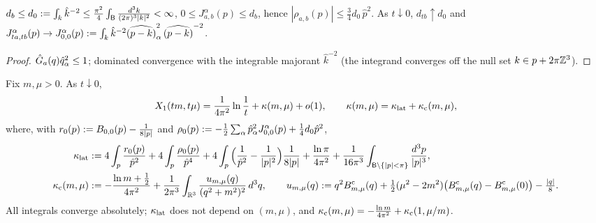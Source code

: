 \begin{lemma}[$d$ and $J$]\label{lem:a05:J}
$d_b\le d_0:=\int_{k}\hat k^{-2}\le\frac{\pi^2}4\int_{\mathsf B}\frac{d^3k}{(2\pi)^3|k|^2}<\infty$, $0\le J^\alpha_{a,b}(p)\le d_b$, hence $|\rho_{a,b}(p)|\le\frac34d_0\,\hat p^2$. As $t\downarrow0$, $d_{tb}\uparrow d_0$ and $J^\alpha_{ta,tb}(p)\to J^\alpha_{0,0}(p):=\int_{k}\hat k^{-2}\widehat{(p-k)}_\alpha^2\,\widehat{(p-k)}^{-2}$.
\end{lemma}
\begin{proof}
$\hat G_a(q)\hat q_\alpha^2\le1$; dominated convergence with the integrable majorant $\hat k^{-2}$ (the integrand converges off the null set $k\in p+2\pi\mathbb Z^3$).
\end{proof}

\begin{theorem}\label{thm:a05:Z}
Fix $m,\mu>0$. As $t\downarrow0$,
\[
X_1(tm,t\mu)=\frac1{4\pi^2}\ln\frac1t+\kappa(m,\mu)+o(1),\qquad\kappa(m,\mu)=\kappa_{\rm lat}+\kappa_{\rm c}(m,\mu),
\]
where, with $r_0(p):= B_{0,0}(p)-\frac1{8|p|}$ and $\rho_0(p):=-\frac12\sum_\alpha\hat p_\alpha^2J^\alpha_{0,0}(p)+\frac14d_0\hat p^2$,
\begin{align*}
\kappa_{\rm lat}&:=4\int_{p}\frac{r_0(p)}{\hat p^2}+4\int_{p}\frac{\rho_0(p)}{\hat p^4}+4\int_{p}\Big(\frac1{\hat p^2}-\frac1{|p|^2}\Big)\frac1{8|p|}+\frac{\ln\pi}{4\pi^2}+\frac1{16\pi^3}\int_{\mathsf B\setminus\{|p|<\pi\}}\frac{d^3p}{|p|^3},\\
\kappa_{\rm c}(m,\mu)&:=-\frac{\ln m+\frac12}{4\pi^2}+\frac1{2\pi^3}\int_{\mathbb R^3}\frac{u_{m,\mu}(q)}{(q^2+m^2)^2}\,d^3q,\qquad
u_{m,\mu}(q):= q^2B^{\mathrm c}_{m,\mu}(q)+\tfrac12(\mu^2-2m^2)\big(B^{\mathrm c}_{m,\mu}(q)-B^{\mathrm c}_{m,\mu}(0)\big)-\tfrac{|q|}8 .
\end{align*}
All integrals converge absolutely; $\kappa_{\rm lat}$ does not depend on $(m,\mu)$, and $\kappa_{\rm c}(m,\mu)=-\frac{\ln m}{4\pi^2}+\kappa_{\rm c}(1,\mu/m)$.
\end{theorem}
